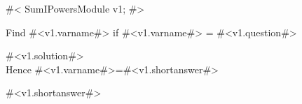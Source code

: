 %


#<
SumIPowersModule v1;
#>

Find #<v1.varname#> if #<v1.varname#> = #<v1.question#>

#<v1.solution#>\\[1.8mm] 
Hence #<v1.varname#>=#<v1.shortanswer#>

#<v1.shortanswer#>


